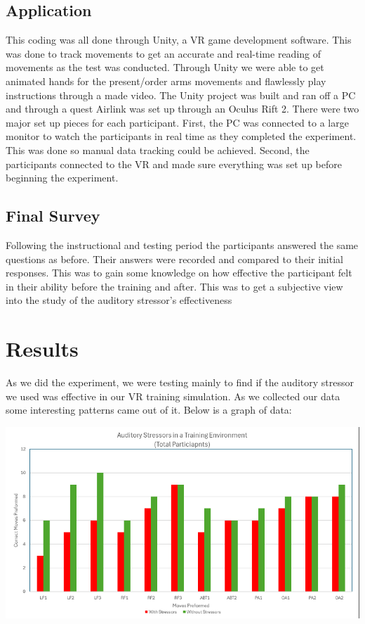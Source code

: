\documentclass[manuscript,screen,review]{acmart}
\begin{document}
\subsection{Application}
This coding was all done through Unity, a VR game development software. This was done to track movements 
to get an accurate and real-time reading of movements as the test was conducted. Through Unity we were 
able to get animated hands for the present/order arms movements and flawlessly play instructions through 
a made video. The Unity project was built and ran off a PC and through a quest Airlink was set up through 
an Oculus Rift 2. There were two major set up pieces for each participant. First, the PC was connected to 
a large monitor to watch the participants in real time as they completed the experiment. This was done so 
manual data tracking could be achieved. Second, the participants connected to the VR and made sure everything 
was set up before beginning the experiment.  

\subsection{Final Survey}
Following the instructional and testing period the participants answered the same questions as before. 
Their answers were recorded and compared to their initial responses. This was to gain some knowledge on 
how effective the participant felt in their ability before the training and after. This was to get a 
subjective view into the study of the auditory stressor's effectiveness

\section{Results}
As we did the experiment, we were testing mainly to find if the auditory stressor we used was effective in our 
VR training simulation. As we collected our data some interesting patterns came out of it. Below is a graph of data: 

\includegraphics[scale=0.8]{MainGraph}
\end{document}
